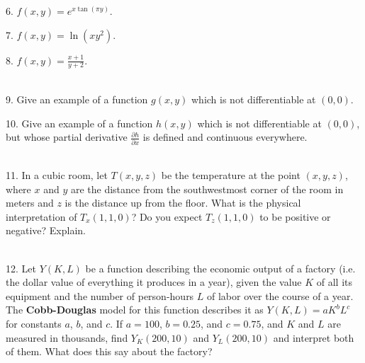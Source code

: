 \documentclass{article}
\begin{document}
6. $f(x, y) = e^{x\tan(\pi y)}$.

7. $f(x, y) = \ln(xy^2)$.

8. $f(x, y) = \frac{x + 1}{y + 2}$.

~\\

9. Give an example of a function $g(x, y)$ which is not differentiable at $(0, 0)$.

10. Give an example of a function $h(x, y)$ which is not differentiable at $(0, 0)$, but whose partial derivative $\frac{\partial h}{\partial x}$ is defined and continuous everywhere.

~\\

11. In a cubic room, let $T(x, y, z)$ be the temperature at the point $(x, y, z)$, where $x$ and $y$ are the distance from the southwestmost corner of the room in meters and $z$ is the distance up from the floor. What is the physical interpretation of $T_x(1, 1, 0)$? Do you expect $T_z(1, 1, 0)$ to be positive or negative? Explain.

~\\

12. Let $Y(K, L)$ be a function describing the economic output of a factory (i.e. the dollar value of everything it produces in a year), given the value $K$ of all its equipment and the number of person-hours $L$ of labor over the course of a year. The \textbf{Cobb-Douglas} model for this function describes it as $Y(K, L) = aK^bL^c$ for constants $a$, $b$, and $c$. If $a = 100$, $b = 0.25$, and $c = 0.75$, and $K$ and $L$ are measured in thousands, find $Y_K(200, 10)$ and $Y_L(200, 10)$ and interpret both of them. What does this say about the factory?
\end{document}
